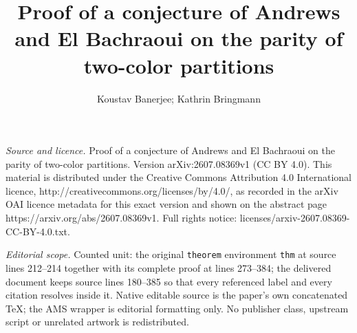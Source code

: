\documentclass[10pt,a4paper]{amsart}
\renewcommand{\(}{\left\(}
\renewcommand{\)}{\right\)}
\numberwithin{equation}{section}
\numberwithin{equation}{section}
\begin{document}
\title[Proof of a conjecture of Andrews and El Bachraoui on the par]{Proof of a conjecture of Andrews and El Bachraoui on the parity of two-color partitions}
\author{Koustav Banerjee; Kathrin Bringmann}
\date{}
\maketitle
\noindent\emph{Source and licence.} Proof of a conjecture of Andrews and El Bachraoui on the parity of two-color partitions. Version arXiv:2607.08369v1 (CC BY 4.0). This material is distributed under the Creative Commons Attribution 4.0 International licence, http://creativecommons.org/licenses/by/4.0/, as recorded in the arXiv OAI licence metadata for this exact version and shown on the abstract page https://arxiv.org/abs/2607.08369v1. Full rights notice: licenses/arxiv-2607.08369-CC-BY-4.0.txt.\par\smallskip
\noindent\textit{Editorial scope.} Counted unit: the original \texttt{theorem} environment \texttt{thm} at source lines 212--214 together with its complete proof at lines 273--384; the delivered document keeps source lines 180--385 so that every referenced label and every citation resolves inside it. Native editable source is the paper's own concatenated TeX; the AMS wrapper is editorial formatting only. No publisher class, upstream script or unrelated artwork is redistributed.
\end{document}
